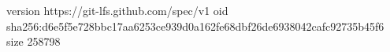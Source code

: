 version https://git-lfs.github.com/spec/v1
oid sha256:d6e5f5e728bbc17aa6253ce939d0a162fe68dbf26de6938042cafc92735b45f6
size 258798

